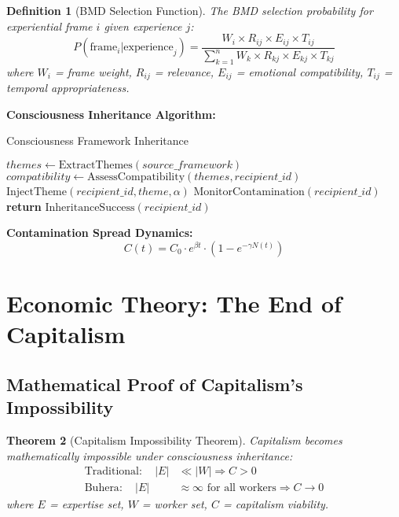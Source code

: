 \documentclass[12pt,a4paper]{article}
\newtheorem{theorem}{Theorem}[section]
\newtheorem{definition}[theorem]{Definition}
\begin{document}
\begin{definition}[BMD Selection Function]
The BMD selection probability for experiential frame $i$ given experience $j$:
\begin{equation}
P(\text{frame}_i | \text{experience}_j) = \frac{W_i \times R_{ij} \times E_{ij} \times T_{ij}}{\sum_{k=1}^{n} W_k \times R_{kj} \times E_{kj} \times T_{kj}}
\end{equation}
where $W_i$ = frame weight, $R_{ij}$ = relevance, $E_{ij}$ = emotional compatibility, $T_{ij}$ = temporal appropriateness.
\end{definition}

\textbf{Consciousness Inheritance Algorithm:}
\begin{algorithm}
\caption{Consciousness Framework Inheritance}
\begin{algorithmic}[1]
    \State $themes \leftarrow \text{ExtractThemes}(source\_framework)$
    \State $compatibility \leftarrow \text{AssessCompatibility}(themes, recipient\_id)$
            \State $\text{InjectTheme}(recipient\_id, theme, \alpha)$
        \EndIf
    \EndFor
    \State $\text{MonitorContamination}(recipient\_id)$
    \State \textbf{return} $\text{InheritanceSuccess}(recipient\_id)$
\EndProcedure
\end{algorithmic}
\end{algorithm}

\textbf{Contamination Spread Dynamics:}
\begin{equation}
C(t) = C_0 \cdot e^{\beta t} \cdot (1 - e^{-\gamma N(t)})
\label{eq:contamination_spread}
\end{equation}

\section{Economic Theory: The End of Capitalism}

\subsection{Mathematical Proof of Capitalism's Impossibility}

\begin{theorem}[Capitalism Impossibility Theorem]
Capitalism becomes mathematically impossible under consciousness inheritance:
\begin{align}
\text{Traditional}: \quad |E| &\ll |W| \Rightarrow C > 0\\
\text{Buhera}: \quad |E| &\approx \infty \text{ for all workers} \Rightarrow C \to 0
\end{align}
where $E$ = expertise set, $W$ = worker set, $C$ = capitalism viability.
\end{theorem}
\end{document}
